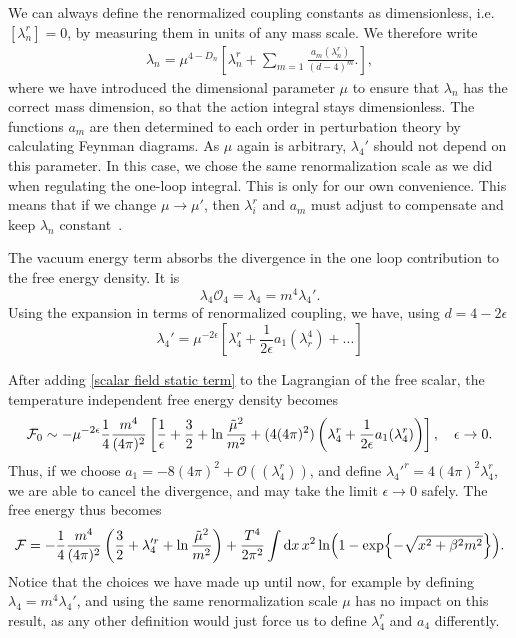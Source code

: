 We can always define the renormalized coupling constants as dimensionless, i.e. $[\lambda_n^r] = 0$, by measuring them in units of any mass scale.
We therefore write 
\begin{align*}
    \lambda_n = \mu^{4 - D_n}
    \left[
        \lambda_n^r + \sum_{m=1} \frac{a_m(\lambda_n^r)}{(d - 4)^{m}}.
    \right],
\end{align*}
where we have introduced the dimensional parameter $\mu$ to ensure that $\lambda_n$ has the correct mass dimension, so that the action integral stays dimensionless.
The functions $a_m$ are then determined to each order in perturbation theory by calculating Feynman diagrams.
As $\mu$ again is arbitrary, $\lambda_4'$ should not depend on this parameter.
In this case, we chose the same renormalization scale as we did when regulating the one-loop integral.
This is only for our own convenience.
This means that if we change $\mu \rightarrow \mu'$, then $\lambda_i^r$ and $a_m$ must adjust to compensate and keep $\lambda_n$ constant~\cite{'t_hoft_dim_reg}.

The vacuum energy term absorbs the divergence in the one loop contribution to the free energy density.
It is
\begin{equation}
    \label{scalar field static term}
    \lambda_4 \mathcal{O}_4 = \lambda_4 = m^4 \lambda_4'.
\end{equation}
Using the expansion in terms of renormalized coupling, we have, using $d = 4 - 2\epsilon$
\begin{equation}
    \lambda_4' = \mu^{- 2 \epsilon}\left[ \lambda_4^r + \frac{1}{2 \epsilon} a_1(\lambda_r^4) + ... \right]
\end{equation}

After adding \cref{scalar field static term} to the Lagrangian of the free scalar, the temperature independent free energy density becomes
\begin{equation}
    \mathcal{F}_0 \sim - \mu^{-2 \epsilon}  \frac{1}{4} \frac{m^4}{(4 \pi)^2}  
    \left[
        \frac{1}{\epsilon} + \frac{3}{2} + \ln{\frac{\tilde \mu^2}{m^2}}
        + (4 (4 \pi)^2) \left(\lambda_4^r + \frac{1}{2\epsilon} a_1(\lambda_4^r)\right)
    \right],
    \quad \epsilon \rightarrow 0.
\end{equation}
Thus, if we choose $a_1 = -8 (4\pi)^2 + \mathcal{O}((\lambda_4^r))$, and define $\lambda_4'^r = 4(4\pi)^2\lambda_4^r$, we are able to cancel the divergence, and may take the limit $\epsilon \rightarrow 0$ safely.
The free energy thus becomes
\begin{equation}
    \mathcal{F} = -\frac{1}{4} \frac{m^4}{(4 \pi)^2} 
    \left(
        \frac{3}{2} + \lambda_4'^r + \ln \frac{\tilde \mu^2}{m^2}
    \right)
    +
    \frac{T^4}{2\pi^2} \int \dd x \, x^2 \ln(1 - \exp{-\sqrt{x^2 + \beta^2 m^2}}).
\end{equation}
Notice that the choices we have made up until now, for example by defining $\lambda_4 = m^4 \lambda_4'$, and using the same renormalization scale $\mu$ has no impact on this result, as any other definition would just force us to define $\lambda_4^r$ and $a_4$ differently.

